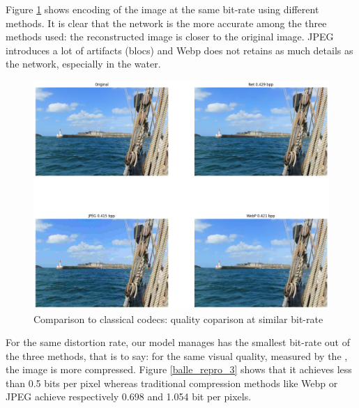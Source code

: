 Figure \ref{balle_repro_2} shows encoding of the image at the same bit-rate using different methods. It is clear that the network is the more accurate among the three methods used: the reconstructed image is closer to the original image. JPEG introduces a lot of artifacts (blocs) and Webp does not retains as much details as the network, especially in the water.

\begin{figure}
    \centering
    \includegraphics[width=15cm]{img/balle_repro_2.png}
    \caption{Comparison to classical codecs: quality coparison at similar bit-rate}
    \label{balle_repro_2}
\end{figure}

For the same distortion rate, our model manages has the smallest bit-rate out of the three methods, that is to say: for the same visual quality, measured by the , the image is more compressed. Figure \ref{balle_repro_3} shows that it achieves less than 0.5 bits per pixel whereas traditional compression methods like Webp or JPEG achieve respectively 0.698 and 1.054 bit per pixels.

